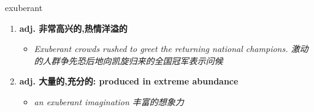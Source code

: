 
\begin{frame}
{\huge exuberant}
\begin{center}
\begin{enumerate}\Large
  \item \textbf{adj. 非常高兴的,热情洋溢的}
  \begin{itemize}
    \item \em{\Large{Exuberant crowds rushed to greet the returning national champions. 激动的人群争先恐后地向凯旋归来的全国冠军表示问候}}
  \end{itemize}
  \item \textbf{adj. 大量的,充分的: produced in extreme abundance}
  \begin{itemize}
    \item \em{\Large{an exuberant imagination 丰富的想象力}}
  \end{itemize}
\end{enumerate}
\end{center}
\end{frame}
